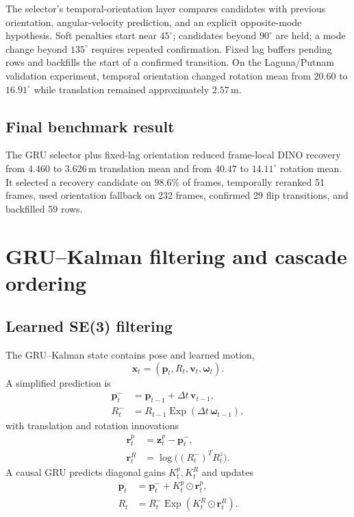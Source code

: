 \documentclass[11pt]{article}
\newcommand{\unitm}{\,\mathrm{m}}
\newcommand{\unitdeg}{^{\circ}}
\begin{document}
The selector's temporal-orientation layer compares candidates with previous orientation, angular-velocity prediction, and an explicit opposite-mode hypothesis.  Soft penalties start near $45\unitdeg$; candidates beyond $90\unitdeg$ are held; a mode change beyond $135\unitdeg$ requires repeated confirmation.  Fixed lag buffers pending rows and backfills the start of a confirmed transition.  On the Laguna/Putnam validation experiment, temporal orientation changed rotation mean from $20.60$ to $16.91\unitdeg$ while translation remained approximately $2.57\unitm$.

\subsection{Final benchmark result}

The GRU selector plus fixed-lag orientation reduced frame-local DINO recovery from $4.460$ to $3.626\unitm$ translation mean and from $40.47$ to $14.11\unitdeg$ rotation mean.  It selected a recovery candidate on $98.6\%$ of frames, temporally reranked 51 frames, used orientation fallback on 232 frames, confirmed 29 flip transitions, and backfilled 59 rows.

\section{GRU--Kalman filtering and cascade ordering}

\subsection{Learned SE(3) filtering}

The GRU--Kalman state contains pose and learned motion,
\begin{equation}
\bm x_t=(\bm p_t,R_t,\bm v_t,\bm\omega_t).
\end{equation}
A simplified prediction is
\begin{align}
\bm p^-_t&=\bm p_{t-1}+\Delta t\,\bm v_{t-1},\\
R^-_t&=R_{t-1}\operatorname{Exp}(\Delta t\,\bm\omega_{t-1}),
\end{align}
with translation and rotation innovations
\begin{align}
\bm r^p_t&=\bm z^p_t-\bm p^-_t,\\
\bm r^R_t&=\log\bigl((R^-_t)^TR^z_t\bigr).
\end{align}
A causal GRU predicts diagonal gains $K^p_t,K^R_t$ and updates
\begin{align}
\bm p_t&=\bm p^-_t+K^p_t\odot\bm r^p_t,\\
R_t&=R^-_t\operatorname{Exp}(K^R_t\odot\bm r^R_t).
\end{align}
\end{document}
